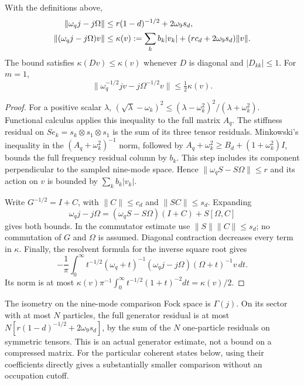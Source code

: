 \begin{proposition}
\label{prop:common-scalar-full-leakage}
With the definitions above,
\begin{align}
 \|\omega_qj-j\Omega\|&\le r(1-d)^{-1/2}+2\omega_9s_d, \notag\\
 \|(\omega_qj-j\Omega)v\|&\le\kappa(v):=
 \sum_k b_k|v_k|+(rc_d+2\omega_9s_d)\|v\|.
 \label{eq:common-scalar-kappa}
\end{align}
The bound satisfies $\kappa(Dv)\le\kappa(v)$ whenever $D$ is diagonal and
$|D_{kk}|\le1$. For $m=1$,
\begin{equation}
 \|\omega_q^{-1/2}jv-j\Omega^{-1/2}v\|
 \le\tfrac12\kappa(v).
 \label{eq:common-scalar-negative-power}
\end{equation}
\end{proposition}
\begin{proof}
For a positive scalar $\lambda$,
$(\sqrt\lambda-\omega_k)^2\le
(\lambda-\omega_k^2)^2/(\lambda+\omega_k^2)$.
Functional calculus applies this inequality to the full matrix $A_q$.
The stiffness residual on $S e_k=s_k\otimes s_1\otimes s_1$ is the sum
of its three tensor residuals. Minkowski's inequality in the
$(A_q+\omega_k^2)^{-1}$ norm, followed by
$A_q+\omega_k^2\ge B_d+(1+\omega_k^2)I$, bounds the full frequency
residual column by $b_k$. This step includes its component perpendicular
to the sampled nine-mode space. Hence
$\|\omega_qS-S\Omega\|\le r$ and its action on $v$ is bounded by
$\sum_kb_k|v_k|$.

Write $G^{-1/2}=I+C$, with $\|C\|\le c_d$ and $\|SC\|\le s_d$.
Expanding
\[
 \omega_qj-j\Omega=(\omega_qS-S\Omega)(I+C)+S[\Omega,C]
\]
gives both bounds. In the commutator estimate use
$\|S\|\|C\|\le s_d$; no commutation of $G$ and $\Omega$ is assumed.
Diagonal contraction decreases every term in $\kappa$.
Finally, the resolvent formula for the inverse square root gives
\[
 -\frac1\pi\int_0^\infty t^{-1/2}
 (\omega_q+t)^{-1}(\omega_qj-j\Omega)(\Omega+t)^{-1}v\,dt.
\]
Its norm is at most
$\kappa(v)\pi^{-1}\int_0^\infty t^{-1/2}(1+t)^{-2}dt
=\kappa(v)/2$.
\end{proof}

The isometry on the nine-mode comparison Fock space is $\Gamma(j)$.
On its sector with at most $N$ particles, the full generator residual is
at most $N[r(1-d)^{-1/2}+2\omega_9s_d]$, by the sum of the $N$ one-particle
residuals on symmetric tensors. This is an actual generator estimate,
not a bound on a compressed matrix. For the particular coherent states
below, using their coefficients directly gives a substantially smaller
comparison without an occupation cutoff.

